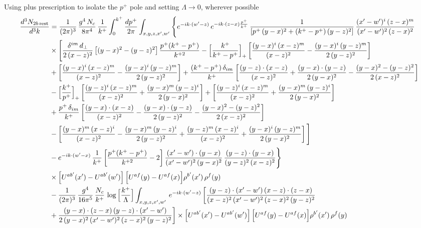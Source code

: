 \documentclass[9pt]{article}
\numberwithin{equation}{section}
\begin{document}
Using plus prescription to isolate the $p^{+}$ pole and setting $\Lambda\to 0$, wherever possible
\begin{align}
\frac{d^{3}N_{2b\,\rm rest}}{d^{3}k} & =\frac{1}{(2\pi)^{3}}\,\frac{g^{4}\,N_{c}}{8\pi^{4}}\,\frac{1}{k^{+}}\int_{0}^{k^{+}}\frac{dp^{+}}{2\pi}\int_{x,y,z,x',w'}\Bigg\{e^{-ik\cdot(w'-z)}\,e^{-ik\cdot(z-x)\frac{p^{+}}{k^{+}}}\,\frac{1}{\left[p^{+}\,(y-x)^{2}+(k^{+}-p^{+})\,(y-z)^{2}\right]}\,\frac{(x'-w')^{i}\,(z-x)^{m}}{(x'-w')^{2}\,(z-x)^{2}}\notag\\
&\times\Bigg[\frac{\delta^{im}\,d_{\perp}}{2\,(x-z)^{2}}\left[(y-x)^{2}-(y-z)^{2}\right]\frac{p^{+}(k^{+}-p^{+})}{k^{+2}}
-\Big[\frac{k^{+}}{k^{+}-p^{+}}\Big]_{+}\left[\frac{(y-x)^{i}\,(x-z)^{m}}{(x-z)^{2}}-\frac{(y-x)^{i}\,(y-z)^{m}}{2\,(y-z)^{2}}\right]\notag\\
&+\left[\frac{(y-x)^{i}\,(x-z)^{m}}{(x-z)^{2}}-\frac{(y-x)^{i}\,(y-z)^{m}}{2\,(y-z)^{2}}\right]
+\frac{(k^{+}-p^{+})\,\delta_{im}}{k^{+}}\left[\frac{(y-z)\cdot(x-z)}{(x-z)^{2}}+\frac{(y-x)\cdot(y-z)}{2\,(y-x)^{2}}-\frac{(y-x)^{2}-(y-z)^{2}}{2\,(x-z)^{2}}\right]\notag\\
&-\Big[\frac{k^{+}}{p^{+}}\Big]_{+}\left[\frac{(y-z)^{i}\,(x-z)^{m}}{(x-z)^{2}}+\frac{(y-x)^{m}\,(y-z)^{i}}{2\,(y-x)^{2}}\right]+\left[\frac{(y-z)^{i}\,(x-z)^{m}}{(x-z)^{2}}+\frac{(y-x)^{m}\,(y-z)^{i}}{2\,(y-x)^{2}}\right]\notag\\
&+\frac{p^{+}\,\delta_{im}}{k^{+}}\left[\frac{(y-x)\cdot(x-z)}{(x-z)^{2}}-\frac{(y-x)\cdot(y-z)}{2\,(y-z)^{2}}-\frac{(y-x)^{2}-(y-z)^{2}}{2\,(x-z)^{2}}\right]\notag\\
&-\left[\frac{(y-x)^{m}\,(x-z)^{i}}{(x-z)^{2}}-\frac{(y-x)^{m}\,(y-z)^{i}}{2\,(y-z)^{2}}+\frac{(y-z)^{m}\,(x-z)^{i}}{(x-z)^{2}}+\frac{(y-x)^{i}\,(y-z)^{m}}{2\,(y-x)^{2}}\right]\Bigg]\notag\\
&-e^{-ik\cdot(w'-x)}\,\frac{1}{k^{+}}\left[\frac{p^{+}(k^{+}-p^{+})}{k^{+2}}-2\right]\frac{(x'-w')\cdot(y-x)}{(x'-w')^{2}\,(y-x)^{2}}\,\frac{(y-z)\cdot(y-x)}{(y-z)^{2}\,(x-z)^{2}}\Bigg\}\notag\\
&\times\Big[U^{ab'}(x')-U^{ab'}(w')\Big]\,\Big[U^{af}(y)-U^{af}(x)\Big]\rho^{b'}(x')\,\rho^{f}(y)\notag \\ & -\frac{1}{(2\pi)^{3}}\,\frac{g^{4}}{16\pi^{5}}\,\frac{N_{c}}{k^{+}}\,\log\Big[\frac{k^{+}}{\Lambda}\Big]\int_{x,y,z,x',w'}\,e^{-ik\cdot(w'-z)}\,\bigg[\frac{(y-z)\cdot (x'-w')\,(x-z)\cdot (z-x)}{(x-z)^{2}\,(x'-w')^{2}\,(z-x)^{2}\,(y-z)^{2}}\notag \\ & +\frac{(y-x)\cdot (z-x)\,(y-z)\cdot (x'-w')}{2\,(y-x)^{2}\,(x'-w')^{2}\,(z-x)^{2}\,(y-z)^{2}}\bigg]\times\Big[U^{ab'}(x')-U^{ab'}(w')\Big]\,\Big[U^{af}(y)-U^{af}(x)\Big]\rho^{b'}(x')\,\rho^{f}(y)\notag\\

\end{align}
\end{document}
